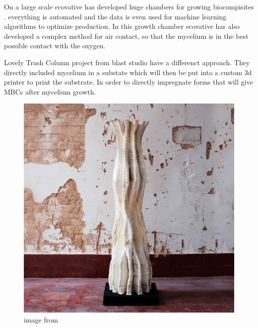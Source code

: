 On a large scale ecovative has developed huge chambers for growing biocompisites \cite{ecovativepatent}. everything is automated and the data is even used for machine learning algorithms to optimize production. 
In this growth chamber ecovative has also developed a complex method for air contact, so that the mycelium is in the best possible contact with the oxygen. 

Lovely Trash Column project from blast studio have a differenct approach\cite{blaststudio}. They directly included mycelium in a substate which will then be put into a custom 3d printer to print the substrate. 
In order to directly impregnate forms that will give MBCs after mycelium growth. 

\begin{figure}[h]
    \centering
    \includegraphics{images/printMycelium.png}
    \caption{image from \cite{blaststudio}}
    \label{fig:blasttrash}
\end{figure} 

